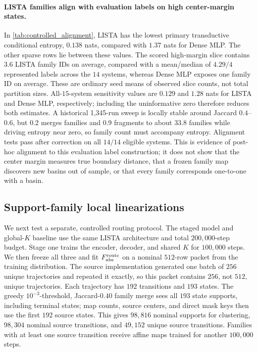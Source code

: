 \documentclass[11pt]{article}
\begin{document}
\paragraph{LISTA families align with evaluation labels on high center-margin states.}
In \cref{tab:controlled_alignment}, LISTA has the lowest primary transductive conditional entropy, \(0.138\) nats, compared with \(1.37\) nats for Dense MLP. The other sparse rows lie between these values. The scored high-margin slice contains \(3.6\) LISTA family IDs on average, compared with a mean/median of \(4.29/4\) represented labels across the \(14\) systems, whereas Dense MLP exposes one family ID on average. These are ordinary seed means of observed slice counts, not total partition sizes. All-\(15\)-system sensitivity values are \(0.129\) and \(1.28\) nats for LISTA and Dense MLP, respectively; including the uninformative zero therefore reduces both estimates. A historical 1,345-run sweep is locally stable around Jaccard \(0.4\)--\(0.6\), but \(0.2\) merges families and \(0.9\) fragments to about \(33.8\) families while driving entropy near zero, so family count must accompany entropy. Alignment tests pass after correction on all \(14/14\) eligible systems. This is evidence of post-hoc alignment to this evaluation label construction; it does not show that the center margin measures true boundary distance, that a frozen family map discovers new basins out of sample, or that every family corresponds one-to-one with a basin.

\subsection{Support-family local linearizations}
\label{sec:fabs_local_linearizations}

We next test a separate, controlled routing protocol. The staged model and global-\(K\) baseline use the same LISTA architecture and total \(200{,}000\)-step budget. Stage one trains the encoder, decoder, and shared \(K\) for \(100{,}000\) steps. We then freeze all three and fit \(F_{\rm abs}^{\rm route}\) on a nominal \(512\)-row packet from the training distribution. The source implementation generated one batch of \(256\) unique trajectories and repeated it exactly, so this packet contains \(256\), not \(512\), unique trajectories. Each trajectory has \(192\) transitions and \(193\) states. The greedy \(10^{-3}\)-threshold, Jaccard-\(0.40\) family merge sees all \(193\) state supports, including terminal states; map counts, source centers, and direct mask keys then use the first \(192\) source states. This gives \(98{,}816\) nominal supports for clustering, \(98{,}304\) nominal source transitions, and \(49{,}152\) unique source transitions. Families with at least one source transition receive affine maps trained for another \(100{,}000\) steps.
\end{document}
